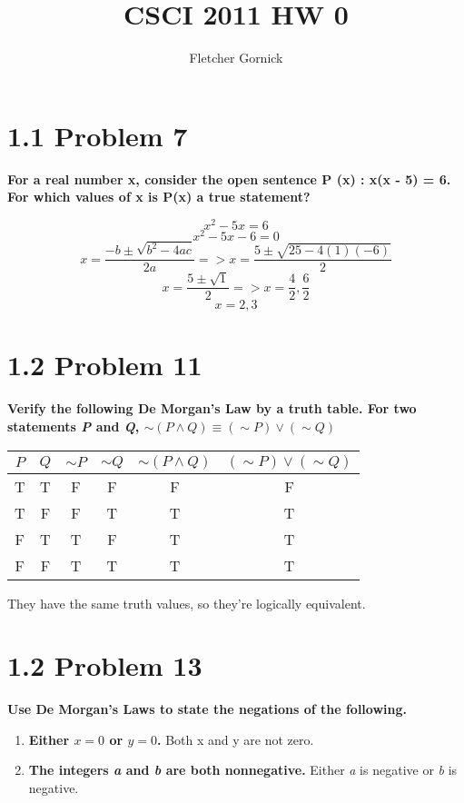 \documentclass[12pt]{article}
\title{CSCI 2011 HW 0}
\author{Fletcher Gornick}
\begin{document}
\maketitle

\section{1.1 Problem 7}
\textbf{For a real number x, consider the open sentence P (x) : x(x - 5) = 6. For 
which values of x is P(x) a true statement?}

$$x^2 -5x = 6$$
$$x^2 -5x -6 = 0$$
$$x = \frac{-b \pm \sqrt{b^2 - 4ac}}{2a} => x = \frac{5 \pm \sqrt{25 - 4(1)(-6)}}{2}$$
$$x = \frac{5 \pm \sqrt{1}}{2} => x = \frac{4}{2}, \frac{6}{2}$$
$$x = 2,3$$


\section{1.2 Problem 11}
\textbf{Verify the following De Morgan’s Law by a truth table. For two statements
\textit{P} and \textit{Q}, $\sim(P \wedge Q) \equiv (\sim P) \vee (\sim Q)$}


\begin{table}[ht]
    \centering
    \begin{tabular}{|c|c|c|c|c|c|}

        \hline
        $P$ & $Q$ & $\sim P$ & $\sim Q$ & $\sim (P \wedge Q)$ & $(\sim P) \vee (\sim Q)$ \\
        \hline
        \hline
        T & T & F & F & \cellcolor[gray]{0.8} F & \cellcolor[gray]{0.8} F \\
        \hline
        T & F & F & T & \cellcolor[gray]{0.8} T & \cellcolor[gray]{0.8} T \\
        \hline
        F & T & T & F & \cellcolor[gray]{0.8} T & \cellcolor[gray]{0.8} T \\
        \hline
        F & F & T & T & \cellcolor[gray]{0.8} T & \cellcolor[gray]{0.8} T \\
        \hline
        
    \end{tabular}
\end{table}

They have the same truth values, so they're logically equivalent.


\section{1.2 Problem 13}
\textbf{Use De Morgan’s Laws to state the negations of the following.}


\begin{enumerate}[label=(\alph*)]
\item \textbf{Either $x=0$ or $y=0$.}
    Both x and y are not zero.

\item \textbf{The integers \textit{a} and \textit{b} are both nonnegative.}
    Either \textit{a} is negative or \textit{b} is negative.

\end{enumerate}
\end{document}
